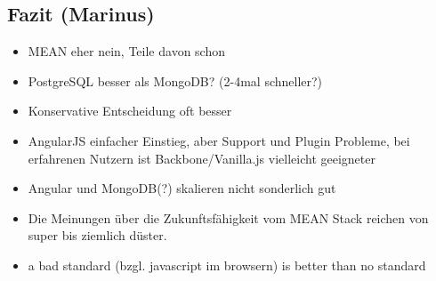 \subsection{Fazit (Marinus)}\label{fazit-marinus}

\begin{itemize}
\itemsep1pt\parskip0pt
\item
  MEAN eher nein, Teile davon schon
\item
  PostgreSQL besser als MongoDB? (2-4mal schneller?)
\item
  Konservative Entscheidung oft besser
\item
  AngularJS einfacher Einstieg, aber Support und Plugin Probleme, bei
  erfahrenen Nutzern ist Backbone/Vanilla.js vielleicht geeigneter
\item
  Angular und MongoDB(?) skalieren nicht sonderlich gut
\item
  Die Meinungen über die Zukunftsfähigkeit vom MEAN Stack reichen von
  super bis ziemlich düster.
\item
  a bad standard (bzgl. javascript im browsern) is better than no
  standard
\end{itemize}